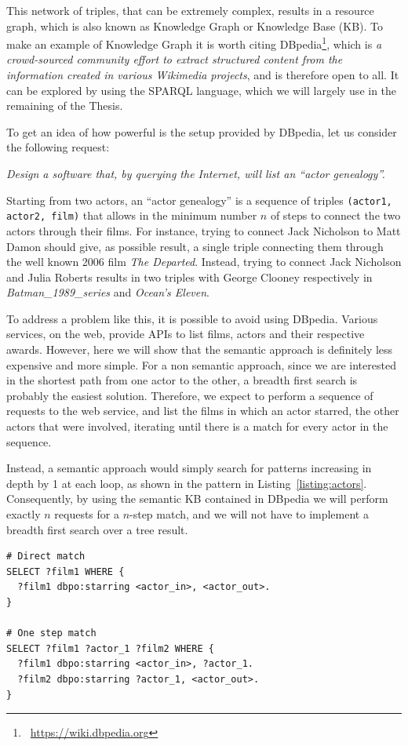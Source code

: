 This network of triples, that can be extremely complex, results in a resource graph, which is also known as Knowledge Graph or Knowledge Base (KB). To make an example of Knowledge Graph it is worth citing DBpedia\footnote{\faLink~\url{https://wiki.dbpedia.org}}, which is \textit{a crowd-sourced community effort to extract structured content from the information created in various Wikimedia projects}, and is therefore open to all. It can be explored by using the SPARQL language, which we will largely use in the remaining of the Thesis.

To get an idea of how powerful is the setup provided by DBpedia, let us consider the following request: 
\begin{center}
\textit{Design a software that, by querying the Internet, will list an ``actor genealogy''.}
\end{center}

Starting from two actors, an ``actor genealogy'' is a sequence of triples \texttt{(actor1, actor2, film)} that allows in the minimum number $n$ of steps to connect the two actors through their films. For instance, trying to connect Jack Nicholson to Matt Damon should give, as possible result, a single triple connecting them through the well known 2006 film \textit{The Departed}. Instead, trying to connect Jack Nicholson and Julia Roberts results in two triples with George Clooney respectively in \textit{Batman\_1989\_series} and \textit{Ocean's Eleven}.

To address a problem like this, it is possible to avoid using DBpedia. Various services, on the web, provide APIs to list films, actors and their respective awards. However, here we will show that the semantic approach is definitely less expensive and more simple. For a non semantic approach, since we are interested in the shortest path from one actor to the other, a breadth first search is probably the easiest solution. Therefore, we expect to perform a sequence of requests to the web service, and list the films in which an actor starred, the other actors that were involved, iterating until there is a match for every actor in the sequence.

Instead, a semantic approach would simply search for patterns increasing in depth by 1 at each loop, as shown in the pattern in Listing~\ref{listing:actors}. Consequently, by using the semantic KB contained in DBpedia we will perform exactly $n$ requests for a $n$-step match, and we will not have to implement a breadth first search over a tree result.
\begin{lstlisting}[label=listing:actors, caption={SPARQL pattern example to solve the actor genealogy problem. Consider Table~\ref{tab:prefixes} for expanded prefixes.}]
# Direct match
SELECT ?film1 WHERE {
  ?film1 dbpo:starring <actor_in>, <actor_out>.
}

# One step match
SELECT ?film1 ?actor_1 ?film2 WHERE {
  ?film1 dbpo:starring <actor_in>, ?actor_1.
  ?film2 dbpo:starring ?actor_1, <actor_out>.
}
\end{lstlisting}

